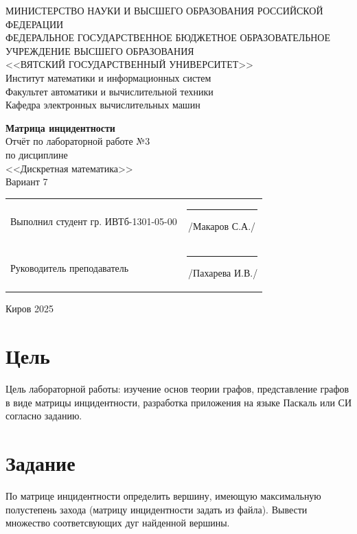 \documentclass[a4paper,14pt]{extarticle}
\begin{document}
  \newpage\thispagestyle{empty}
  \begin{center}
    \MakeUppercase{
      Министерство науки и высшего образования Российской Федерации\\
      Федеральное государственное бюджетное образовательное учреждение высшего образования\\
      <<Вятский Государственный Университет>>\\
    }
    Институт математики и информационных систем\\
    Факультет автоматики и вычислительной техники\\
    Кафедра электронных вычислительных машин
  \end{center}
  \vfill

  \begin{center}
    \textbf{Матрица инцидентности}\\
    Отчёт по лабораторной работе №3\\
    по дисциплине\\
    <<Дискретная математика>>\\
    Вариант 7
  \end{center}
  \vfill

  \noindent
  \begin{tabular}{ll}
    Выполнил студент гр. ИВТб-1301-05-00 \hspace{5mm} &
    \rule[-1mm]{25mm}{0.10mm}\,/Макаров С.А./\\
    
    Руководитель преподаватель & \rule[-1mm]{25mm}{0.10mm}\,/Пахарева И.В./\\
  \end{tabular}

  \vfill
  \begin{center}
    Киров 2025
  \end{center}

  \newpage
  \section*{\hspace{12.5mm}Цель}
  Цель лабораторной работы: изучение основ теории графов, представление графов в виде матрицы инцидентности, разработка приложения на языке Паскаль или СИ согласно заданию.

  \section*{\hspace{12.5mm}Задание}
  По матрице инцидентности определить вершину, имеющую максимальную полустепень захода (матрицу инцидентности задать из файла). Вывести множество соответсвующих дуг найденной вершины.
\end{document}
